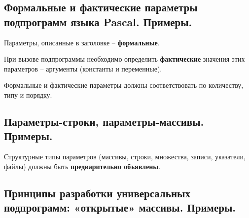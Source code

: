 



\newpage\subsection{Формальные и фактические параметры подпрограмм языка Pascal. Примеры. }

\begin{myquote}
\end{myquote}

Параметры, описанные в заголовке – {\bf формальные}. 

При вызове подпрограммы необходимо определить {\bf фактические} значения этих параметров – аргументы (константы и переменные).

Формальные и фактические параметры должны соответствовать по количеству, типу и порядку.



\newpage\subsection{Параметры-строки, параметры-массивы. Примеры. }

\begin{myquote}
\end{myquote}

Структурные типы параметров (массивы, строки, множества, записи, указатели, файлы) должны быть {\bf предварительно объявлены}.





\newpage\subsection{Принципы разработки универсальных подпрограмм: «открытые» массивы. Примеры. }

\begin{myquote}
            
\end{myquote}

